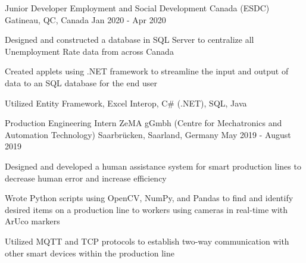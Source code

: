 \begin{cventries}
{\begin{cvitems}
      \end{cvitems}
    }
  \cventry
    {Junior Developer} %
    {Employment and Social Development Canada (ESDC)} %
    {Gatineau, QC, Canada} %
    {Jan 2020 - Apr 2020} %
    {
      \begin{cvitems} %
\item Designed and constructed a database in SQL Server to centralize all Unemployment Rate data from across Canada
\item Created applets using .NET framework to streamline the input and output of data to an SQL database for the end user
\item Utilized Entity Framework, Excel Interop, C\# (.NET), SQL, Java 
      \end{cvitems}
    }

  \cventry
    {Production Engineering Intern} %
    {ZeMA gGmbh (Centre for Mechatronics and Automation Technology)} %
    {Saarbrücken, Saarland, Germany} %
    { May 2019 - August 2019} %
    {
      \begin{cvitems} %
\item Designed and developed a human assistance system for smart production lines to decrease human error and increase efficiency
\item Wrote Python scripts using OpenCV, NumPy, and Pandas to find and identify desired items on a production line to workers using cameras in real-time with ArUco markers
\item Utilized MQTT and TCP protocols to establish two-way communication with other smart devices within the production line
      \end{cvitems}
    }

\end{cventries}
